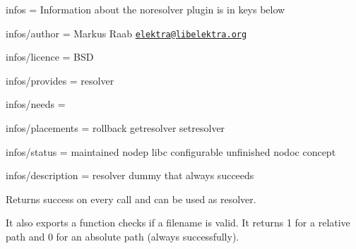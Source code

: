 
\begin{DoxyItemize}
\item infos = Information about the noresolver plugin is in keys below
\item infos/author = Markus Raab \href{mailto:elektra@libelektra.org}{\tt elektra@libelektra.\+org}
\item infos/licence = B\+SD
\item infos/provides = resolver
\item infos/needs =
\item infos/placements = rollback getresolver setresolver
\item infos/status = maintained nodep libc configurable unfinished nodoc concept
\item infos/description = resolver dummy that always succeeds
\end{DoxyItemize}

Returns success on every call and can be used as resolver.

It also exports a function checks if a filename is valid. It returns 1 for a relative path and 0 for an absolute path (always successfully). 